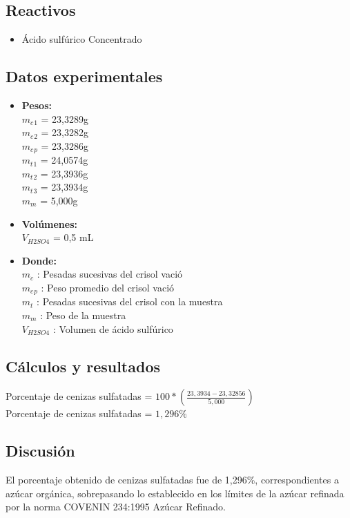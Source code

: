 \documentclass[a4paper,12pt]{article} %
\begin{document}
\subsection{Reactivos} 
\begin{itemize}
    \item{Ácido sulfúrico Concentrado} 
\end{itemize}

\subsection{Datos experimentales} 
\begin{itemize}
    \item{\textbf{Pesos:}} \\
    $m_c{}_1$ = 23,3289g \\ 
    $m_c{}_2$ = 23,3282g \\
    $m_c{}_p$ = 23,3286g \\
    $m_t{}_1$ = 24,0574g \\
    $m_t{}_2$ = 23,3936g \\
    $m_t{}_3$ = 23,3934g \\ 
    $m_m$ = 5,000g \\ 

    \item{\textbf{Volúmenes:}} \\
    $V_{H2SO4}$ = 0,5 mL 

    \item{\textbf{Donde:}} \\ 
    $m_c$ : Pesadas sucesivas del crisol vació \\ 
    $m_c{}_p$ : Peso promedio del crisol vació \\ 
    $m_t{}$ : Pesadas sucesivas del crisol con la muestra \\
    $m_m$ : Peso de la muestra \\ 
    $V_{H2SO4}$ : Volumen de ácido sulfúrico
\end{itemize}

\subsection{Cálculos y resultados} 
Porcentaje de cenizas sulfatadas = $100*(\frac{23,3934-23,32856}{5,000})$\\
Porcentaje de cenizas sulfatadas = $1,296\%$

\subsection{Discusión} 
El porcentaje obtenido de cenizas sulfatadas fue de 1,296\%, correspondientes a azúcar orgánica, sobrepasando lo establecido en los límites de la azúcar refinada por la norma COVENIN 234:1995 Azúcar Refinado. 
\end{document}
